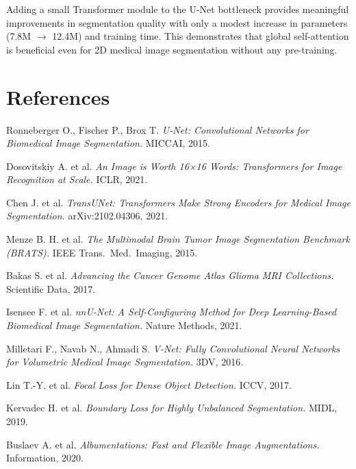 \documentclass[12pt, a4paper]{article}
\begin{document}
Adding a small Transformer module to the U-Net bottleneck provides meaningful improvements in segmentation quality with only a modest increase in parameters (7.8M $\to$ 12.4M) and training time. This demonstrates that global self-attention is beneficial even for 2D medical image segmentation without any pre-training.

\section*{References}

\begin{enumerate}[label={[\arabic*]}]
    \item Ronneberger O., Fischer P., Brox T. \textit{U-Net: Convolutional Networks for Biomedical Image Segmentation.} MICCAI, 2015.
    \item Dosovitskiy A. et al. \textit{An Image is Worth 16×16 Words: Transformers for Image Recognition at Scale.} ICLR, 2021.
    \item Chen J. et al. \textit{TransUNet: Transformers Make Strong Encoders for Medical Image Segmentation.} arXiv:2102.04306, 2021.
    \item Menze B. H. et al. \textit{The Multimodal Brain Tumor Image Segmentation Benchmark (BRATS).} IEEE Trans.\ Med.\ Imaging, 2015.
    \item Bakas S. et al. \textit{Advancing the Cancer Genome Atlas Glioma MRI Collections.} Scientific Data, 2017.
    \item Isensee F. et al. \textit{nnU-Net: A Self-Configuring Method for Deep Learning-Based Biomedical Image Segmentation.} Nature Methods, 2021.
    \item Milletari F., Navab N., Ahmadi S. \textit{V-Net: Fully Convolutional Neural Networks for Volumetric Medical Image Segmentation.} 3DV, 2016.
    \item Lin T.-Y. et al. \textit{Focal Loss for Dense Object Detection.} ICCV, 2017.
    \item Kervadec H. et al. \textit{Boundary Loss for Highly Unbalanced Segmentation.} MIDL, 2019.
    \item Buslaev A. et al. \textit{Albumentations: Fast and Flexible Image Augmentations.} Information, 2020.
\end{enumerate}
\end{document}
